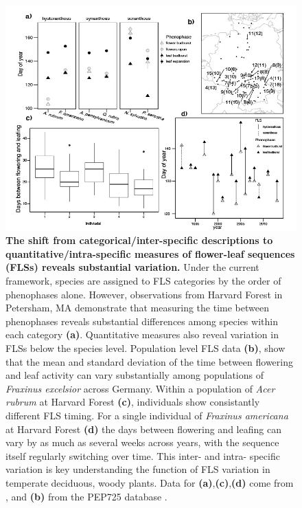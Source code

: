 \documentclass[11pt]{article}
\begin{document}
 \begin{figure}[h!]
        \centering
         \includegraphics[width=\textwidth]{..//..//intraspecificplots-01.jpg}
          \caption{\textbf{The shift from categorical/inter-specific descriptions to quantitative/intra-specific measures of flower-leaf sequences (FLSs) reveals substantial variation.} Under the current framework, species are assigned to FLS categories by the order of phenophases alone. However, observations from Harvard Forest in Petersham, MA demonstrate that measuring the time between phenophases reveals substantial differences among species within each category \textbf{(a)}. Quantitative measures also reveal variation in FLSs below the species level. Population level FLS data \textbf{(b)}, show that the mean and standard deviation of the time between flowering and leaf activity can vary substantially among populations of \emph{Fraxinus excelsior} across Germany. Within a population of \emph{Acer rubrum} at Harvard Forest \textbf{(c)}, individuals show consistantly different FLS timing. For a single individual of \emph{Fraxinus americana} at Harvard Forest \textbf{(d)} the days between flowering and leafing can vary by as much as several weeks across years, with the sequence itself regularly switching over time. This inter- and intra- specific variation is key understanding the function of FLS variation in temperate deciduous, woody plants. Data for \textbf{(a)},\textbf{(c)},\textbf{(d)} come from \citet{OKeefe2015}, and \textbf{(b)} from the PEP725 database \citep{PEP725}.}
        \label{fig:vizzy}
    \end{figure}
\end{document}

